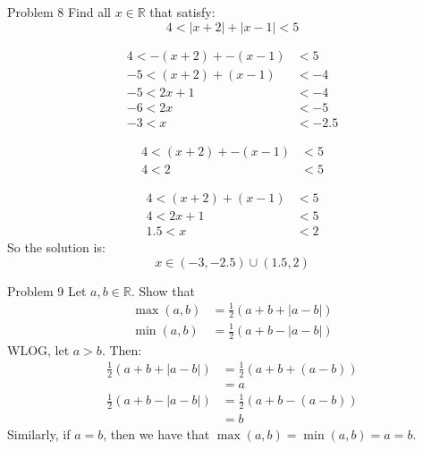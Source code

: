 \documentclass[10pt]{extarticle}
\newcommand{\R}{\mathbb{R}}
\begin{document}
  \begin{problem}{Problem 8}
    Find all $x\in\R$ that satisfy:
    \[
      4 < |x+2| + |x-1| < 5
    \] 
    \tcblower
    \begin{description}[font=\scshape]
      \item[Case 1: $x < -2$]
    \end{description}
    \begin{align*}
      4 < -(x+2) + -(x-1) &<5\\
      -5<(x+2) + (x-1) &< -4\\
      -5 < 2x+1 &< -4 \\
      -6 < 2x &< -5 \\
      -3 < x &< -2.5
    \end{align*}
    \begin{description}[font=\scshape]
      \item[Case 2: $-2\leq x < 1$]
    \end{description}
    \begin{align*}
      4 < (x+2) + -(x-1) &<5\\
      4 < 2 &< 5 \tag*{$\bot$}
    \end{align*}
    \begin{description}[font=\scshape]
      \item[Case 3: $1 \leq x$]
    \end{description}
    \begin{align*}
      4 < (x+2) + (x-1) &<5\\
      4 < 2x+1 &< 5\\
      1.5 < x &< 2
    \end{align*}
    So the solution is:
    \[
      x\in (-3,-2.5) \cup (1.5,2)
    \] 
  \end{problem}
  \begin{problem}{Problem 9}
    Let $a,b\in\R$. Show that
    \begin{align*}
      \max(a,b) &= \frac{1}{2}(a+b+|a-b|)\\
      \min(a,b) &= \frac{1}{2}(a+b-|a-b|)
    \end{align*}
    \tcblower
    WLOG, let $a > b$. Then:
    \begin{align*}
      \frac{1}{2}(a + b + |a-b|) &= \frac{1}{2}(a + b + (a-b)) \\
                                 &= a\\
      \frac{1}{2}(a+b-|a-b|) &= \frac{1}{2}(a+b-(a-b))\\
                             &= b
    \end{align*}
    Similarly, if $a = b$, then we have that $\max(a,b) = \min(a,b) = a = b$.
  \end{problem}
\end{document}
